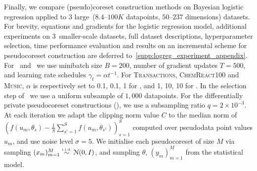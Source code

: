 Finally, we compare (pseudo)coreset construction methods on Bayesian logistic
regression applied to 3 large~($8.4$--$100K$ datapoints, $50$--$237$
dimensions) datasets. For brevity, equations and gradients for the logistic
regression model, additional experiments on \mbox{3 smaller-scale} datasets,
full dataset descriptions, hyperparameter selection, time performance
evaluation and results on an incremental scheme for pseudocoreset construction
are deferred to~\cref{supp:logreg_experiment_appendix}. 
%
%
 For \psvi~and \sparsevi~we use minibatch size ${B=200}$, number of gradient
updates ${T=500}$, and learning rate schedules $ \gamma_t = \alpha t^{-1}$. For
\textsc{Transactions}, \textsc{ChemReact100} and \textsc{Music}, $\alpha$ is
respectively set to 0.1, 0.1, 1 for \sparsevi, and 1, 10, 10 for \psvi. In the
selection step of \sparsevi~we use a uniform subsample of $1,000$ datapoints.
For the differentially private pseudocoreset constructions (\dpsvi), we  use a
subsampling ratio $q=2\times10^{-3}$. At each iteration we adapt the clipping
norm value $ C $ to the median norm of $( f(u_m, \theta_s) - \frac{1}{S}
\sum_{s'=1}^{S} f(u_m, \theta_{s'}))_{s=1}^{S}$ computed
over pseudodata point values $u_m$, and use noise level $\sigma=5$. We
initialise each pseudocoreset of size $ M$ via sampling $(x_m)_{m=1}^{M} \distiid
\distNorm{(0, I)}$, and sampling $\theta$, $ (y_m)_{m=1}^{M} $ from the statistical
model.


